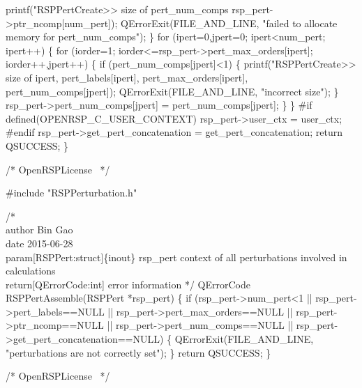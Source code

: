        printf("RSPPertCreate>> size of pert_num_comps %
               rsp_pert->ptr_ncomp[num_pert]);
        QErrorExit(FILE_AND_LINE, "failed to allocate memory for pert_num_comps");
    \}
    for (ipert=0,jpert=0; ipert<num_pert; ipert++) \{
        for (iorder=1; iorder<=rsp_pert->pert_max_orders[ipert]; iorder++,jpert++) \{
            if (pert_num_comps[jpert]<1) \{
                printf("RSPPertCreate>> size of %
                       ipert,
                       pert_labels[ipert],
                       pert_max_orders[ipert],
                       pert_num_comps[jpert]);
                QErrorExit(FILE_AND_LINE, "incorrect size");
            \}
            rsp_pert->pert_num_comps[jpert] = pert_num_comps[jpert];
        \}
    \}
#if defined(OPENRSP_C_USER_CONTEXT)
    rsp_pert->user_ctx = user_ctx;
#endif
    rsp_pert->get_pert_concatenation = get_pert_concatenation;
    return QSUCCESS;
\}

\nwendcode{}\endmoddef
/*
  \LA{}OpenRSPLicense~{\nwtagstyle{}}\RA{}
*/

#include "RSPPerturbation.h"

/*%
    \\author Bin Gao
    \\date 2015-06-28
    \\param[RSPPert:struct]\{inout\} rsp_pert context of all perturbations involved in calculations
    \\return[QErrorCode:int] error information
*/
QErrorCode RSPPertAssemble(RSPPert *rsp_pert)
\{
    if (rsp_pert->num_pert<1 ||
        rsp_pert->pert_labels==NULL ||
        rsp_pert->pert_max_orders==NULL ||
        rsp_pert->ptr_ncomp==NULL ||
        rsp_pert->pert_num_comps==NULL ||
        rsp_pert->get_pert_concatenation==NULL) \{
        QErrorExit(FILE_AND_LINE, "perturbations are not correctly set");
    \}
    return QSUCCESS;
\}

\nwendcode{}\endmoddef
/*
  \LA{}OpenRSPLicense~{\nwtagstyle{}}\RA{}
*/

